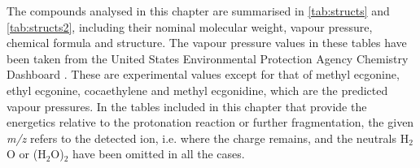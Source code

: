 %
%
%
%

The compounds analysed in this chapter are summarised in \autoref{tab:structs} and \autoref{tab:structs2}, including their nominal molecular weight, vapour pressure, chemical formula and structure.
%
The vapour pressure values in these tables have been taken from the United States Environmental Protection Agency Chemistry Dashboard \cite{USAEPA}. These are experimental values except for that of methyl ecgonine, ethyl ecgonine, cocaethylene and methyl ecgonidine, which are the predicted vapour pressures.
%
 In the tables included in this chapter that provide the energetics relative to the protonation reaction or further fragmentation, the given \textit{m/z} refers to the detected ion, i.e. where the charge remains, and the neutrals H$_2$O or (H$_2$O)$_2$ have been omitted in all the cases.





